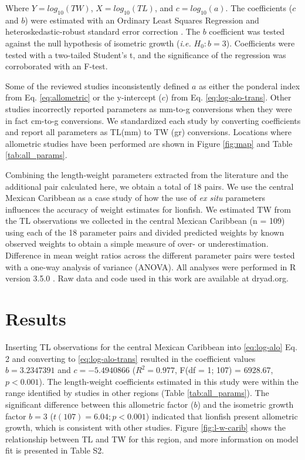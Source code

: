 \documentclass[fleqn,10pt,lineno]{wlpeerj} %
\begin{document}
Where \(Y = log_{10}(TW)\), \(X = log_{10}(TL)\), and
\(c = log_{10}(a)\). The coefficients (\(c\) and \(b\)) were estimated
with an Ordinary Least Squares Regression and heteroskedastic-robust
standard error correction \citep{zeileis_2004}. The \(b\) coefficient
was tested against the null hypothesis of isometric growth (\emph{i.e.}
\(H_0: b = 3\)). Coefficients were tested with a two-tailed Student's t,
and the significance of the regression was corroborated with an F-test.

Some of the reviewed studies inconsistently defined \(a\) as either the
ponderal index from Eq. \ref{eq:allometric} or the y-intercept (\(c\))
from Eq. \ref{eq:log-alo-trans}. Other studies incorrectly reported
parameters as mm-to-g conversions when they were in fact cm-to-g
conversions. We standardized each study by converting coefficients and
report all parameters as TL(mm) to TW (gr) conversions. Locations where
allometric studies have been performed are shown in Figure \ref{fig:map}
and Table \ref{tab:all_params}.

Combining the length-weight parameters extracted from the literature and
the additional pair calculated here, we obtain a total of 18 pairs. We
use the central Mexican Caribbean as a case study of how the use of
\emph{ex situ} parameters influences the accuracy of weight estimates
for lionfish. We estimated TW from the TL observations we collected in
the central Mexican Caribbean (n = 109) using each of the 18 parameter
pairs and divided predicted weights by known observed weights to obtain
a simple measure of over- or underestimation. Difference in mean weight
ratios across the different parameter pairs were tested with a one-way
analysis of variance (ANOVA). All analyses were performed in R version
3.5.0 \citep{rcore_2018} . Raw data and code used in this work are
available at dryad.org.

\section*{Results}

Inserting TL observations for the central Mexican Caribbean into
\ref{eq:log-alo} Eq. 2 and converting to \ref{eq:log-alo-trans} resulted
in the coefficient values \(b = 3.2347391\) and \(c = -5.4940866\)
(\(R^2 = 0.977\), F(df = 1; 107) = 6928.67, \(p < 0.001\)). The
length-weight coefficients estimated in this study were within the range
identified by studies in other regions (Table \ref{tab:all_params}). The
significant difference between this allometric factor (\(b\)) and the
isometric growth factor \(b = 3\) (\(t(107) = 6.04; p<0.001\)) indicated
that lionfish present allometric growth, which is consistent with other
studies. Figure \ref{fig:l-w-carib} shows the relationship between TL
and TW for this region, and more information on model fit is presented
in Table S2.
\end{document}

